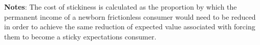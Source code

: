 \begin{minipage}{\textwidth}
\begin{table}
{\begin{tabular}{lllcccc}
      \end{tabular}   
    } 
    \usebox{\EqbmBox}  
    \settowidth\TableWidth{\usebox{\EqbmBox}} %
    \medskip\medskip \vspace{0.0cm} \parbox{\TableWidth}{\footnotesize
      \begin{flushleft}
        \textbf{Notes}: The cost of stickiness is calculated as the proportion by which the permanent income of a newborn frictionless consumer would need to be reduced in order to achieve the same reduction of expected value associated with forcing them to become a sticky expectations consumer.
      \end{flushleft}
    }
  \end{table}
\end{minipage}
